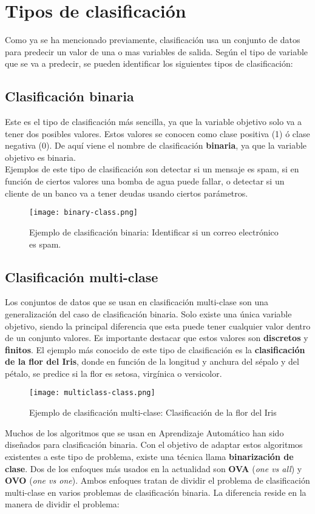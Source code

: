 \section{Tipos de clasificación}
Como ya se ha mencionado previamente, clasificación usa un conjunto de datos para predecir un valor de una o mas variables de salida. Según el tipo de variable que se va a predecir, se pueden identificar los siguientes tipos de clasificación:
\subsection*{Clasificación binaria}
Este es el tipo de clasificación más sencilla, ya que la variable objetivo solo va a tener dos posibles valores. Estos valores se conocen como clase positiva (1) ó clase negativa (0). De aquí viene el nombre de clasificación \textbf{binaria}, ya que la variable objetivo es binaria.\\
Ejemplos de este tipo de clasificación son detectar si un mensaje es spam, si en función de ciertos valores una bomba de agua puede fallar, o detectar si un cliente de un banco va a tener deudas usando ciertos parámetros.
\begin{figure}[H]
	\centering
	\texttt{[image: binary-class.png]}
	\caption{Ejemplo de clasificación binaria: Identificar si un correo electrónico es spam.}
	\label{fig:bclass}
\end{figure}
\subsection*{Clasificación multi-clase}
Los conjuntos de datos que se usan en clasificación multi-clase son una generalización del caso de clasificación binaria. Solo existe una única variable objetivo, siendo la principal diferencia que esta puede tener cualquier valor dentro de un conjunto valores. Es importante destacar que estos valores son \textbf{discretos} y \textbf{finitos}. El ejemplo más conocido de este tipo de clasificación es la \textbf{clasificación de la flor del Iris}, donde en función de la longitud y anchura del sépalo y del pétalo, se predice si la flor es setosa, virgínica o versicolor.
\begin{figure}[H]
	\centering
	\texttt{[image: multiclass-class.png]}
	\caption{Ejemplo de clasificación multi-clase: Clasificación de la flor del Iris}
	\label{fig:mcclass}
\end{figure}
Muchos de los algoritmos que se usan en Aprendizaje Automático han sido diseñados para clasificación binaria. Con el objetivo de adaptar estos algoritmos existentes a este tipo de problema, existe una técnica llama \textbf{binarización de clase}.
Dos de los enfoques más usados en la actualidad son \textbf{OVA} (\textit{one vs all}) y \textbf{OVO} (\textit{one vs one}). Ambos enfoques tratan de dividir el problema de clasificación multi-clase en varios problemas de clasificación binaria. La diferencia reside en la manera de dividir el problema:
